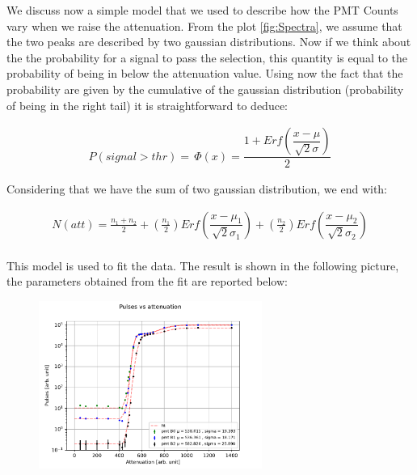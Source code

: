 We discuss now a simple model that we used to describe how the PMT Counts vary when we raise the attenuation. From the plot \ref{fig:Spectra}, we assume that the two peaks are described by two gaussian distributions. Now if we think about the the probability for a signal to pass the selection, this quantity is equal to the probability of being in below the attenuation value. Using now the fact that the probability are given by the cumulative of the gaussian distribution (probability of being in the right tail) it is straightforward to deduce:

\begin{align*}
P(signal > thr) = \, \Phi(x) = \dfrac{1 + Erf(\dfrac{x - \mu}{\sqrt{2} \sigma })}{2}
\end{align*}

Considering that we have the sum of two gaussian distribution, we end with:

\begin{equation} \label{eq:ModelAtt}
\begin{split}
N(att) = \frac{n_{1} + n_{2}}{2} + (\frac{n_{1}}{2}) Erf(\dfrac{x - \mu_{1}}{\sqrt{2} \sigma_{1} })   + (\frac{n_{2}}{2}) Erf(\dfrac{x - \mu_{2}}{\sqrt{2} \sigma_{2}}) \\
\end{split}
\end{equation}

This model is used to fit the data. The result is shown in the following picture, the parameters obtained from the fit are reported below:

\begin{figure}
\centering
\includegraphics[width = 0.65\textwidth ]{Analysis/CalibrationPMT/Fit_attenuation.pdf}
\end{figure}

